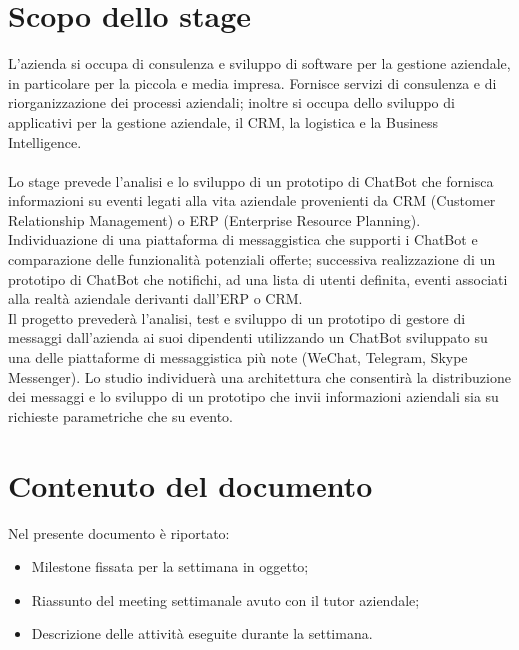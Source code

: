 \documentclass[11pt,notitlepage]{article}
\begin{document}
\section*{Scopo dello stage}

L’azienda si occupa di consulenza e sviluppo di software per la gestione aziendale, in particolare per la piccola
e media impresa. Fornisce servizi di consulenza e di riorganizzazione dei processi aziendali; inoltre si occupa
dello sviluppo di applicativi per la gestione aziendale, il CRM, la logistica e la Business Intelligence. \\ \\
Lo stage prevede l’analisi e lo sviluppo di un prototipo di ChatBot che fornisca informazioni su eventi legati alla
vita aziendale provenienti da CRM (Customer Relationship Management) o ERP (Enterprise Resource Planning). \\
Individuazione di una piattaforma di messaggistica che supporti i ChatBot e comparazione delle funzionalità
potenziali offerte; successiva realizzazione di un prototipo di ChatBot che notifichi, ad una lista di utenti definita,
eventi associati alla realtà aziendale derivanti dall’ERP o CRM. \\
Il progetto prevederà l’analisi, test e sviluppo di un prototipo di gestore di messaggi dall’azienda ai suoi dipendenti
utilizzando un ChatBot sviluppato su una delle piattaforme di messaggistica più note (WeChat, Telegram, Skype
Messenger). Lo studio individuerà una architettura che consentirà la distribuzione dei messaggi e lo sviluppo di
un prototipo che invii informazioni aziendali sia su richieste parametriche che su evento.

\bigskip
\section*{Contenuto del documento}
Nel presente documento è riportato: 
\begin{itemize}
		\item Milestone fissata per la settimana in oggetto;
		\item Riassunto del meeting settimanale avuto con il tutor aziendale;
		\item Descrizione delle attività eseguite durante la settimana.
	\end{itemize} 

\newpage
\end{document}
